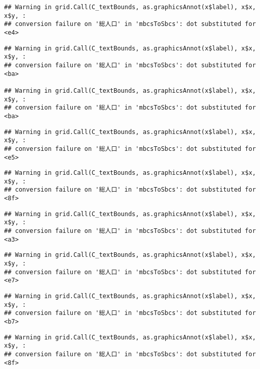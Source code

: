 \documentclass[
]{article}
\begin{document}
\begin{verbatim}
## Warning in grid.Call(C_textBounds, as.graphicsAnnot(x$label), x$x, x$y, :
## conversion failure on '総人口' in 'mbcsToSbcs': dot substituted for <e4>
\end{verbatim}

\begin{verbatim}
## Warning in grid.Call(C_textBounds, as.graphicsAnnot(x$label), x$x, x$y, :
## conversion failure on '総人口' in 'mbcsToSbcs': dot substituted for <ba>

## Warning in grid.Call(C_textBounds, as.graphicsAnnot(x$label), x$x, x$y, :
## conversion failure on '総人口' in 'mbcsToSbcs': dot substituted for <ba>
\end{verbatim}

\begin{verbatim}
## Warning in grid.Call(C_textBounds, as.graphicsAnnot(x$label), x$x, x$y, :
## conversion failure on '総人口' in 'mbcsToSbcs': dot substituted for <e5>
\end{verbatim}

\begin{verbatim}
## Warning in grid.Call(C_textBounds, as.graphicsAnnot(x$label), x$x, x$y, :
## conversion failure on '総人口' in 'mbcsToSbcs': dot substituted for <8f>
\end{verbatim}

\begin{verbatim}
## Warning in grid.Call(C_textBounds, as.graphicsAnnot(x$label), x$x, x$y, :
## conversion failure on '総人口' in 'mbcsToSbcs': dot substituted for <a3>
\end{verbatim}

\begin{verbatim}
## Warning in grid.Call(C_textBounds, as.graphicsAnnot(x$label), x$x, x$y, :
## conversion failure on '総人口' in 'mbcsToSbcs': dot substituted for <e7>
\end{verbatim}

\begin{verbatim}
## Warning in grid.Call(C_textBounds, as.graphicsAnnot(x$label), x$x, x$y, :
## conversion failure on '総人口' in 'mbcsToSbcs': dot substituted for <b7>
\end{verbatim}

\begin{verbatim}
## Warning in grid.Call(C_textBounds, as.graphicsAnnot(x$label), x$x, x$y, :
## conversion failure on '総人口' in 'mbcsToSbcs': dot substituted for <8f>
\end{verbatim}
\end{document}
